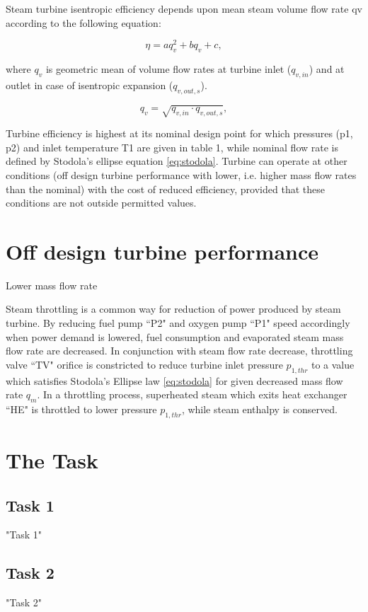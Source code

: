 \documentclass{article}
\begin{document}
	Steam turbine isentropic efficiency depends upon mean steam volume flow rate qv according to the following equation:
	
	\begin{equation}\label{eq:eta2}
		\eta = aq_v^2 + bq_v + c,
	\end{equation}
	
	\noindent
	where $q_v$ is geometric mean of volume flow rates at turbine inlet ($q_{v,in}$) and at outlet in case of isentropic expansion ($q_{v,out,s}$). 
	
	\begin{equation}\label{eq:q_v}
		q_v = \sqrt{q_{v,in} \cdot q_{v,out,s}},
	\end{equation}
	
	Turbine efficiency is highest at its nominal design point for which pressures (p1, p2) and inlet temperature T1 are given in table 1, while nominal flow rate is defined by Stodola’s ellipse equation \ref{eq:stodola}. Turbine can operate at other conditions (off design turbine performance with lower, i.e. higher mass flow rates than the nominal) with the cost of reduced efficiency, provided that these conditions are not outside permitted values.
	
	\section{Off design turbine performance}
	
	Lower mass flow rate
	
	Steam throttling is a common way for reduction of power produced by steam turbine. By reducing fuel pump “P2" and oxygen pump “P1" speed accordingly when power demand is lowered, fuel consumption and evaporated steam mass flow rate are decreased. In conjunction with steam flow rate decrease, throttling valve “TV" orifice is constricted to reduce turbine inlet pressure $p_{1,thr}$ to a value which satisfies Stodola’s Ellipse law \ref{eq:stodola} for given decreased mass flow rate $q_m$. In a throttling process, superheated steam which exits heat exchanger “HE" is throttled to lower pressure $p_{1,thr}$, while steam enthalpy is conserved. 
	
	
	\section{The Task}
	
	\subsection{Task 1}
	
	{"Task 1"}
	
	\subsection{Task 2}
	
	{"Task 2"}
	
	
	
\end{document}
